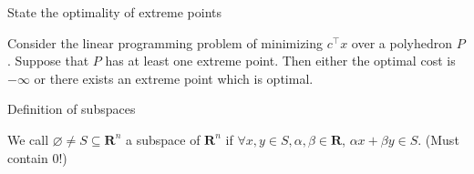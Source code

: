 \documentclass[11pt]{article}
\newcommand{\reals}{\mathbf{R}}
\newcommand*{\xfield}[1]{\begin{mdframed}\centering #1\end{mdframed}\bigskip}
\newenvironment{field}{}{}
\newenvironment{note}{}{}
\begin{document}
%
\begin{note}
  \xfield{State the optimality of extreme points}
  \begin{field}
    Consider the linear programming problem of minimizing \(c^\top x\)
    over a polyhedron \(P\). Suppose that \(P\) has at least one
    extreme point. Then either the optimal cost is \(-\infty\) or
    there exists an extreme point which is optimal.
  \end{field}
\end{note}
\begin{note}
  \xfield{Definition of subspaces}
  \begin{field}
    We call \(\varnothing \not = S \subseteq \reals^n\) a subspace of
    \(\reals^n\) if \(\forall x, y \in S, \alpha, \beta \in \reals\),
    \(\alpha x + \beta y \in S\). (Must contain \(0\)!)
  \end{field}
\end{note}
\end{document}
